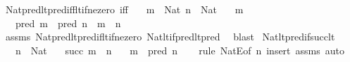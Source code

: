 \begin{isabellebody}
{\isafoldproof}%
%
\isadelimproof
\isanewline
%
\endisadelimproof
\isanewline
{}\isamarkupfalse%
\ Nat{\isacharunderscore}{\kern0pt}pred{\isacharunderscore}{\kern0pt}lt{\isacharunderscore}{\kern0pt}pred{\isacharunderscore}{\kern0pt}iff{\isacharunderscore}{\kern0pt}lt{\isacharunderscore}{\kern0pt}if{\isacharunderscore}{\kern0pt}ne{\isacharunderscore}{\kern0pt}zero\ {\isacharbrackleft}{\kern0pt}iff{\isacharbrackright}{\kern0pt}{\isacharcolon}{\kern0pt}\isanewline
\ \ \ {\isachardoublequoteopen}m\ {\isacharcolon}{\kern0pt}\ Nat{\isachardoublequoteclose}\ {\isachardoublequoteopen}n\ {\isacharcolon}{\kern0pt}\ Nat{\isachardoublequoteclose}\isanewline
\ \ \ {\isachardoublequoteopen}m\ {\isasymnoteq}\ {}{\isachardoublequoteclose}\isanewline
\ \ \ {\isachardoublequoteopen}pred\ m\ {\isacharless}{\kern0pt}\ pred\ n\ {\isasymlongleftrightarrow}\ m\ {\isacharless}{\kern0pt}\ n{\isachardoublequoteclose}\isanewline
%
\isadelimproof
\ \ %
\endisadelimproof
%
\isatagproof
{}\isamarkupfalse%
\ assms\ Nat{\isacharunderscore}{\kern0pt}pred{\isacharunderscore}{\kern0pt}lt{\isacharunderscore}{\kern0pt}pred{\isacharunderscore}{\kern0pt}if{\isacharunderscore}{\kern0pt}lt{\isacharunderscore}{\kern0pt}if{\isacharunderscore}{\kern0pt}ne{\isacharunderscore}{\kern0pt}zero\ Nat{\isacharunderscore}{\kern0pt}lt{\isacharunderscore}{\kern0pt}if{\isacharunderscore}{\kern0pt}pred{\isacharunderscore}{\kern0pt}lt{\isacharunderscore}{\kern0pt}pred\ \isamarkupfalse%
\ blast%
\endisatagproof
{\isafoldproof}%
%
\isadelimproof
\isanewline
%
\endisadelimproof
\isanewline
{}\isamarkupfalse%
\ Nat{\isacharunderscore}{\kern0pt}lt{\isacharunderscore}{\kern0pt}pred{\isacharunderscore}{\kern0pt}if{\isacharunderscore}{\kern0pt}succ{\isacharunderscore}{\kern0pt}lt{\isacharcolon}{\kern0pt}\isanewline
\ \ \ {\isachardoublequoteopen}n\ {\isacharcolon}{\kern0pt}\ Nat{\isachardoublequoteclose}\isanewline
\ \ \ {\isachardoublequoteopen}succ\ m\ {\isacharless}{\kern0pt}\ n{\isachardoublequoteclose}\isanewline
\ \ \ {\isachardoublequoteopen}m\ {\isacharless}{\kern0pt}\ pred\ n{\isachardoublequoteclose}\isanewline
%
\isadelimproof
\ \ %
\endisadelimproof
%
\isatagproof
{}\isamarkupfalse%
\ {\isacharparenleft}{\kern0pt}rule\ NatE{\isacharbrackleft}{\kern0pt}of\ n{\isacharbrackright}{\kern0pt}{\isacharparenright}{\kern0pt}\ {\isacharparenleft}{\kern0pt}insert\ assms{\isacharcomma}{\kern0pt}\ auto{\isacharparenright}{\kern0pt}%

\end{isabellebody}
